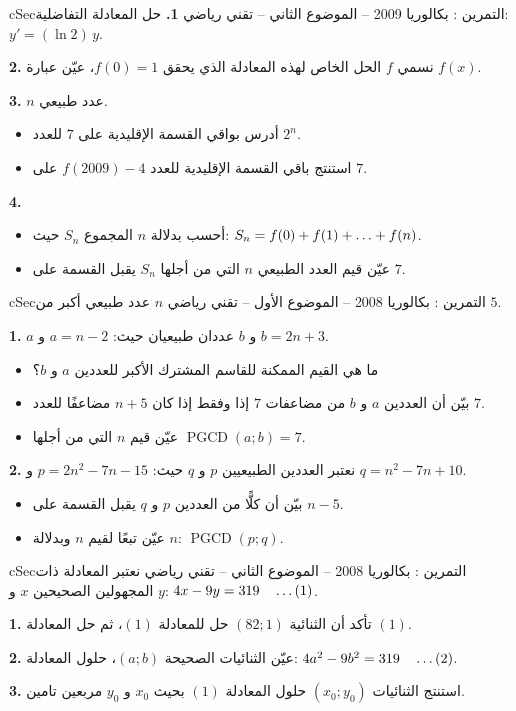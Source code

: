 \documentclass[12pt,a4paper]{article}
\newenvironment{BOX}[2]{\begin{otherlanguage}{english}\begin{arbox}{#1}{#2}}{\end{arbox}\end{otherlanguage}}
\newcounter{exo}
\newenvironment{tamrin}[1]{\stepcounter{exo}\begin{BOX}{cSec}{التمرين \theexo: #1}}{\end{BOX}}
\renewcommand{\dots}{\mathinner{\ldotp\ldotp\ldotp}}
\newcommand{\pgcd}{\operatorname{PGCD}}
\newenvironment{sq}{\begin{itemize}[leftmargin=2.4em,itemsep=3pt]}{\end{itemize}}
\newcommand{\qa}{\item[(أ)]}\newcommand{\qb}{\item[(ب)]}\newcommand{\qc}{\item[(جـ)]}\newcommand{\qd}{\item[(د)]}\newcommand{\qe}{\item[(هـ)]}
\begin{document}
\begin{tamrin}{بكالوريا 2009 -- الموضوع الثاني -- تقني رياضي}
\textbf{1.} حل المعادلة التفاضلية: $y'=(\ln2)\,y$.

\textbf{2.} نسمي $f$ الحل الخاص لهذه المعادلة الذي يحقق $f(0)=1$، عيّن عبارة $f(x)$.

\textbf{3.} $n$ عدد طبيعي.
\begin{sq}
\qa أدرس بواقي القسمة الإقليدية على $7$ للعدد $2^n$.
\qb استنتج باقي القسمة الإقليدية للعدد $f(2009)-4$ على $7$.
\end{sq}

\textbf{4.}
\begin{sq}
\qa أحسب بدلالة $n$ المجموع $S_n$ حيث: $S_n=f(0)+f(1)+\dots+f(n)$.
\qb عيّن قيم العدد الطبيعي $n$ التي من أجلها $S_n$ يقبل القسمة على $7$.
\end{sq}
\end{tamrin}

\begin{tamrin}{بكالوريا 2008 -- الموضوع الأول -- تقني رياضي}
$n$ عدد طبيعي أكبر من $5$.

\textbf{1.} $a$ و $b$ عددان طبيعيان حيث: $a=n-2$ و $b=2n+3$.
\begin{sq}
\qa ما هي القيم الممكنة للقاسم المشترك الأكبر للعددين $a$ و $b$؟
\qb بيّن أن العددين $a$ و $b$ من مضاعفات $7$ إذا وفقط إذا كان $n+5$ مضاعفًا للعدد $7$.
\qc عيّن قيم $n$ التي من أجلها $\pgcd(a;b)=7$.
\end{sq}

\textbf{2.} نعتبر العددين الطبيعيين $p$ و $q$ حيث: $p=2n^2-7n-15$ و $q=n^2-7n+10$.
\begin{sq}
\qa بيّن أن كلًّا من العددين $p$ و $q$ يقبل القسمة على $n-5$.
\qb عيّن تبعًا لقيم $n$ وبدلالة $n$: $\pgcd(p;q)$.
\end{sq}
\end{tamrin}

\begin{tamrin}{بكالوريا 2008 -- الموضوع الثاني -- تقني رياضي}
نعتبر المعادلة ذات المجهولين الصحيحين $x$ و $y$: \quad $4x-9y=319\quad\dots(1)$.

\textbf{1.} تأكد أن الثنائية $(82;1)$ حل للمعادلة $(1)$، ثم حل المعادلة $(1)$.

\textbf{2.} عيّن الثنائيات الصحيحة $(a;b)$، حلول المعادلة: $4a^2-9b^2=319\quad\dots(2)$.

\textbf{3.} استنتج الثنائيات $(x_0;y_0)$ حلول المعادلة $(1)$ بحيث $x_0$ و $y_0$ مربعين تامين.
\end{tamrin}
\end{document}
